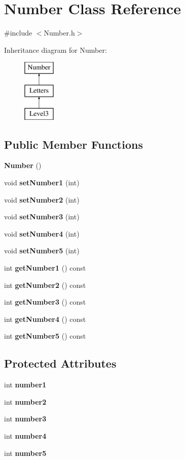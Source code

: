 \section{Number Class Reference}
\label{class_number}


{\ttfamily \#include $<$Number.\+h$>$}

Inheritance diagram for Number\+:\begin{figure}[H]
\begin{center}
\leavevmode
\includegraphics[height=3.000000cm]{class_number}
\end{center}
\end{figure}
\subsection*{Public Member Functions}
\begin{DoxyCompactItemize}
\item 
\textbf{ Number} ()
\item 
void \textbf{ set\+Number1} (int)
\item 
void \textbf{ set\+Number2} (int)
\item 
void \textbf{ set\+Number3} (int)
\item 
void \textbf{ set\+Number4} (int)
\item 
void \textbf{ set\+Number5} (int)
\item 
int \textbf{ get\+Number1} () const
\item 
int \textbf{ get\+Number2} () const
\item 
int \textbf{ get\+Number3} () const
\item 
int \textbf{ get\+Number4} () const
\item 
int \textbf{ get\+Number5} () const
\end{DoxyCompactItemize}
\subsection*{Protected Attributes}
\begin{DoxyCompactItemize}
\item 
int \textbf{ number1}
\item 
int \textbf{ number2}
\item 
int \textbf{ number3}
\item 
int \textbf{ number4}
\item 
int \textbf{ number5}
\end{DoxyCompactItemize}


